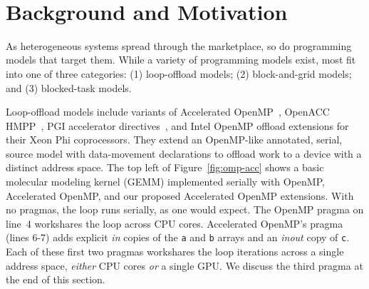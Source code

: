 \begin{figure*}[t]
	\centering
        \begin{minipage}[b]{1.1\textwidth}
            \begin{minipage}[b]{.41\textwidth}
                \ifm
                \inputminted[numberblanklines=false,linenos=true,fontsize=\scriptsize,frame=single]{c}{snippets/omp_acc.c}
                \else
                
                \fi
                \ifm
                \inputminted[numberblanklines=false,linenos=true,fontsize=\scriptsize,frame=single]{c}{snippets/cuda.c}
                \else
                
                \fi
            \end{minipage}
            ~
            ~
            ~
            ~
            \begin{minipage}[b]{.46\textwidth}
                \ifm
                \inputminted[numberblanklines=false,linenos=true,fontsize=\scriptsize,frame=single]{c}{snippets/ompss.c}
                \else
                
                \fi
            \end{minipage}
        \end{minipage}
	\caption{A basic GEMM kernel as implemented in OpenMP variants (top
        left), CUDA (bottom left) and OmpSs (right).}
	\label{fig:omp-acc}
\end{figure*}



\section{Background and Motivation}
\label{sec:background}

As heterogeneous systems spread through the marketplace, so do
programming models that target them. While a variety of programming
models exist, most
fit into one of three categories: (1) loop-offload models; (2)
block-and-grid models; and (3) blocked-task models.

Loop-offload models include variants of Accelerated
OpenMP~\cite{Beyer:2011ib}, OpenACC~\cite{openacc}
HMPP~\cite{dolbeau2007hmpp}, PGI accelerator
directives~\cite{Wolfe:2010bk}, and Intel OpenMP offload extensions for their
Xeon Phi coprocessors.
They extend an OpenMP-like annotated, serial, source model with
data-movement declarations to offload work to a device with a distinct
address space. The top left of Figure~\ref{fig:omp-acc} shows a basic
molecular modeling kernel (GEMM) implemented serially with OpenMP,
Accelerated OpenMP, and our proposed Accelerated OpenMP extensions.
With no pragmas, the loop runs serially, as one would expect. The
OpenMP pragma on line~4 workshares the loop across CPU cores.
Accelerated OpenMP's pragma (lines 6-7) adds explicit \emph{in}
copies of the \verb#a# and \verb#b# arrays and an \emph{inout} copy of
\verb#c#.  Each of these first two pragmas workshares the loop
iterations across a single address space, \emph{either} CPU cores
\emph{or} a single GPU.  We discuss the third pragma at the end
of this section.

